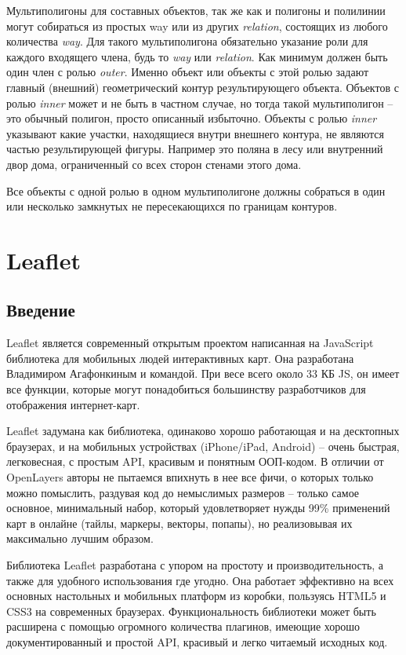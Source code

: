 Мультиполигоны для составных объектов, так же как и полигоны и полилинии могут 
собираться из простых way или из других \emph{relation}, состоящих из любого 
количества \emph{way}. Для такого мультиполигона обязательно указание роли для 
каждого входящего члена, будь то \emph{way} или \emph{relation}. Как минимум 
должен быть один член с ролью \emph{outer}. Именно объект или объекты с этой 
ролью задают главный (внешний) геометрический контур результирующего объекта. 
Объектов с ролью \emph{inner} может и не быть в частном случае, но тогда такой 
мультиполигон -- это обычный полигон, просто описанный избыточно. Объекты с 
ролью \emph{inner} указывают какие участки, находящиеся внутри внешнего 
контура, не являются частью результирующей фигуры. Например это поляна в лесу 
или внутренний двор дома, ограниченный со всех сторон стенами этого дома.

Все объекты с одной ролью в одном мультиполигоне должны собраться в один или 
несколько замкнутых не пересекающихся по границам контуров.\cite{habrahabr01}

\chapter{Leaflet}
\section{Введение}

Leaflet является современный открытым проектом написанная на JavaScript 
библиотека для мобильных людей интерактивных карт. Она разработана Владимиром 
Агафонкиным и командой. При весе всего около 33 КБ JS, он имеет все функции, 
которые могут понадобиться большинству разработчиков для отображения 
интернет-карт.

Leaflet задумана как библиотека, одинаково хорошо работающая и на десктопных 
браузерах, и на мобильных устройствах (iPhone/iPad, Android) -- очень быстрая, 
легковесная, с простым API, красивым и понятным ООП-кодом. В отличии от 
OpenLayers\cite{openlayers} авторы не пытаемся впихнуть в нее все фичи, о 
которых только можно помыслить, раздувая код до немыслимых размеров -- 
только самое основное, минимальный набор, который удовлетворяет нужды 99\% 
применений карт в онлайне (тайлы, маркеры, векторы, попапы), но 
реализовывая их максимально лучшим образом.

Библиотека Leaflet разработана с упором на простоту и производительность, а 
также для удобного использования где угодно. Она работает эффективно на всех 
основных настольных и мобильных платформ из коробки, пользуясь HTML5 и CSS3 
на современных браузерах. Функциональность библиотеки может быть расширена 
с помощью огромного количества плагинов, имеющие хорошо документированный и 
простой API, красивый и легко читаемый исходных код.\cite{leaflet}

